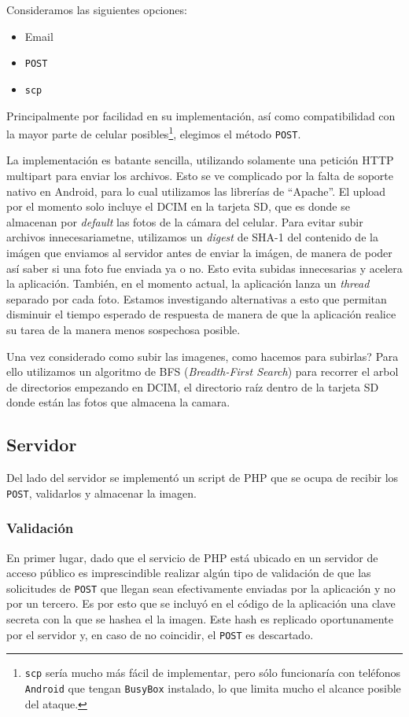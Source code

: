 Consideramos las siguientes opciones:
\begin{itemize}
	\item Email
	\item \texttt{POST}
	\item \texttt{scp}
\end{itemize}

Principalmente por facilidad en su implementación, así como compatibilidad con la mayor parte de celular posibles\footnote{\texttt{scp} sería mucho más fácil de implementar, pero sólo funcionaría con teléfonos \texttt{Android} que tengan \texttt{BusyBox} instalado, lo que limita mucho el alcance posible del ataque.}, elegimos el método \texttt{POST}.

La implementación es batante sencilla, utilizando solamente una petición HTTP multipart para enviar los archivos. Esto se ve complicado por la falta de soporte nativo en Android, para lo cual utilizamos las librerías de ``Apache''. El upload por el momento solo incluye el DCIM en la tarjeta SD, que es donde se almacenan por \textit{default} las fotos de la cámara del celular. Para evitar subir archivos innecesariametne, utilizamos un \textit{digest} de SHA-1 del contenido de la imágen que enviamos al servidor antes de enviar la imágen, de manera de poder así saber si una foto fue enviada ya o no. Esto evita subidas innecesarias y acelera la aplicación. También, en el momento actual, la aplicación lanza un \textit{thread} separado por cada foto. Estamos investigando alternativas a esto que permitan disminuir el tiempo esperado de respuesta de manera de que la aplicación realice su tarea de la manera menos sospechosa posible.

Una vez considerado como subir las imagenes, como hacemos para subirlas? Para ello utilizamos un algoritmo de 
BFS (\textit{Breadth-First Search}) para recorrer el arbol de directorios empezando en DCIM, el directorio raíz
dentro de la tarjeta SD donde están las fotos que almacena la camara.

\subsection{Servidor} %
\label{sub:Servidor}
Del lado del servidor se implementó un script de PHP que se ocupa de recibir los \texttt{POST}, validarlos y almacenar la imagen.

\subsubsection{Validación} %
En primer lugar, dado que el servicio de PHP está ubicado en un servidor de acceso público es imprescindible realizar algún tipo de validación de que las solicitudes de \texttt{POST} que llegan sean efectivamente enviadas por la aplicación y no por un tercero. Es por esto que se incluyó en el código de la aplicación una clave secreta con la que se hashea el la imagen. Este hash es replicado oportunamente por el servidor y, en caso de no coincidir, el \texttt{POST} es descartado.
\label{subsub:Validación}

